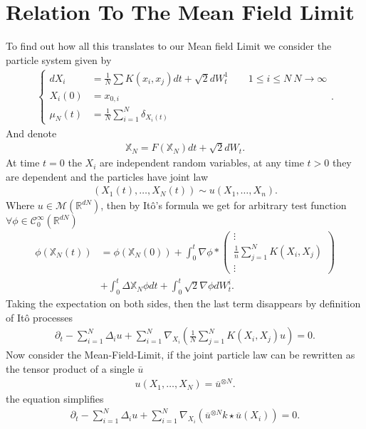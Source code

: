 \section{Relation To The Mean Field Limit}
To find out how all this translates to our Mean field Limit we consider the particle system given by 
\begin{align*}
  \begin{cases}  
  d X_i &=  \frac{1}{N} \sum K(x_i,x_j) dt + \sqrt{2} dW_t^1  \qquad 1\le i\le N \ N\to \infty\\
  X_i(0)    &= x_{0,i} \\
  \mu_N(t) &= \frac{1}{N} \sum_{i=1}^{N} \delta_{X_i(t)} 
  \end{cases}
.\end{align*}
And denote 
\begin{align*}
  \mathbb{X}_N = F(\mathbb{X}_N) dt + \sqrt{2}dW_{t} 
.\end{align*}
At time $t = 0$ the $X_i$ are independent random variables, at any time $t>0$ they are dependent and the particles have joint law 
\begin{align*}
  (X_{1}(t),\ldots ,X_N(t)) \sim  u(X_{1},\ldots ,X_n)
.\end{align*}
Where $u \in  \mathcal{M}(\mathbb{R}^{dN})$, then by It\^o's formula we get for arbitrary test function $\forall  \phi  \in  \mathcal{C}_0^{\infty}(\mathbb{R}^{dN} ) $ 
\begin{align*}
  \phi(\mathbb{X}_N(t)) &=  \phi(\mathbb{X}_N(0)) + \int_0^{t} \nabla\phi  *\begin{pmatrix} \vdots \\ \frac{1}{n} \sum_{j=1}^{N} K(X_i,X_j) \\ \vdots  \end{pmatrix} \\
                        &+ \int_0^{t}  \Delta{\mathbb{X}_N} \phi  dt + \int_0^{t} \sqrt{2} \nabla \phi  dW_t^{i} 
.\end{align*}
Taking the expectation on both sides, then the last term disappears by definition of It\^o processes 
\begin{align*}
  \partial_t - \sum_{i=1}^{N} \Delta_i u  + \sum_{i=1}^{N} \nabla_{X_i} \left( \frac{1}{N} \sum_{j=1}^{N} K(X_i,X_j) u \right)  = 0
.\end{align*}
Now consider the Mean-Field-Limit, if the joint particle law can be rewritten as the tensor product of a single $\overline{u}$ 
\begin{align*}
 u(X_{1},\ldots ,X_N)  = \overline{u}^{\otimes N}  
.\end{align*}
the equation simplifies
\begin{align*}
  \partial_t - \sum_{i=1}^{N} \Delta_i u  + \sum_{i=1}^{N} \nabla_{X_i} \left( \overline{u}^{\otimes N}k \star \overline{u}(X_i)   \right)  = 0
.\end{align*}
